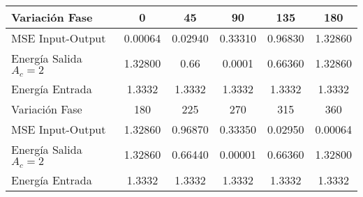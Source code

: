 \begin{table}[H]
	\centering
	\caption{\scriptsize}
	\label{tab:varacionFrecuencia}
	\vspace{-3mm}
	\tiny\begin{tabular}{|l|c|c|c|c|c|}
		\hline
		Variación Fase         & 0       & 45      & 90      & 135            & 180   \\ \hline
		MSE Input-Output       & 0.00064  & 0.02940 & 0.33310    & 0.96830    & 1.32860 \\ \hline
		Energía Salida $A_c=2$ & 1.32800 & 0.66  & 0.0001 & 0.66360           & 1.32860 \\ \hline
		Energía Entrada        & 1.3332  & 1.3332  & 1.3332  & 1.3332         & 1.3332 \\ \hline \hline
		Variación Fase   & 180     & 225     & 270     & 315      & 360   \\ \hline
		MSE Input-Output       & 1.32860 & 0.96870 & 0.33350 & 0.02950   & 0.00064 \\ \hline
		Energía Salida $A_c=2$ & 1.32860 & 0.66440 & 0.00001 & 0.66360   & 1.32800 \\ \hline
		Energía Entrada        & 1.3332  & 1.3332  & 1.3332  & 1.3332   & 1.3332 \\ \hline
	\end{tabular}

\end{table}

